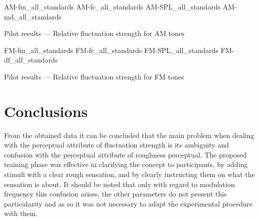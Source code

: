 \documentclass[../main.tex]{subfiles}
\begin{document}
\begin{pilotresults}

\myfigurequad%
  {AM-fm_all_standards}
  {AM-fc_all_standards}
  {AM-SPL_all_standards}
  {AM-md_all_standards}
  {
    \caption{Pilot results --- Relative fluctuation strength for AM tones}
\label{fig:pilot_AM_all_comparison}
  }

\myfigurequad%
  {FM-fm_all_standards}
  {FM-fc_all_standards}
  {FM-SPL_all_standards}
  {FM-df_all_standards}
  {
    \caption{Pilot results --- Relative fluctuation strength for FM tones}
\label{fig:pilot_FM_all_comparison}
  }

\end{pilotresults}

\section{Conclusions}

From the obtained data it can be concluded that the main problem when dealing
with the perceptual attribute of fluctuation strength is its ambiguity and
confusion with the perceptual attribute of roughness perceptual. The proposed
training phase was effective in clarifying the concept to participants, by
adding stimuli with a clear rough sensation, and by clearly instructing them on
what the sensation is about. It should be noted that only with regard to
modulation frequency this confusion arises, the other parameters do not present
this particularity and as so it was not necessary to adapt the experimental
procedure with them.
\end{document}
